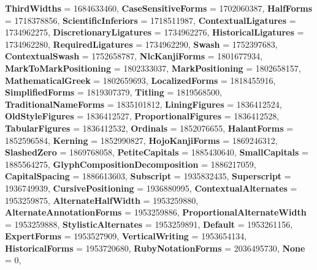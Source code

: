 \begin{DoxyCompactItemize}
\newline
{\bfseries Third\+Widths} = 1684633460, 
{\bfseries Case\+Sensitive\+Forms} = 1702060387, 
{\bfseries Half\+Forms} = 1718378856, 
{\bfseries Scientific\+Inferiors} = 1718511987, 
\newline
{\bfseries Contextual\+Ligatures} = 1734962275, 
{\bfseries Discretionary\+Ligatures} = 1734962276, 
{\bfseries Historical\+Ligatures} = 1734962280, 
{\bfseries Required\+Ligatures} = 1734962290, 
\newline
{\bfseries Swash} = 1752397683, 
{\bfseries Contextual\+Swash} = 1752658787, 
{\bfseries Nlc\+Kanji\+Forms} = 1801677934, 
{\bfseries Mark\+To\+Mark\+Positioning} = 1802333037, 
\newline
{\bfseries Mark\+Positioning} = 1802658157, 
{\bfseries Mathematical\+Greek} = 1802659693, 
{\bfseries Localized\+Forms} = 1818455916, 
{\bfseries Simplified\+Forms} = 1819307379, 
\newline
{\bfseries Titling} = 1819568500, 
{\bfseries Traditional\+Name\+Forms} = 1835101812, 
{\bfseries Lining\+Figures} = 1836412524, 
{\bfseries Old\+Style\+Figures} = 1836412527, 
\newline
{\bfseries Proportional\+Figures} = 1836412528, 
{\bfseries Tabular\+Figures} = 1836412532, 
{\bfseries Ordinals} = 1852076655, 
{\bfseries Halant\+Forms} = 1852596584, 
\newline
{\bfseries Kerning} = 1852990827, 
{\bfseries Hojo\+Kanji\+Forms} = 1869246312, 
{\bfseries Slashed\+Zero} = 1869768058, 
{\bfseries Petite\+Capitals} = 1885430640, 
\newline
{\bfseries Small\+Capitals} = 1885564275, 
{\bfseries Glyph\+Composition\+Decomposition} = 1886217059, 
{\bfseries Capital\+Spacing} = 1886613603, 
{\bfseries Subscript} = 1935832435, 
\newline
{\bfseries Superscript} = 1936749939, 
{\bfseries Cursive\+Positioning} = 1936880995, 
{\bfseries Contextual\+Alternates} = 1953259875, 
{\bfseries Alternate\+Half\+Width} = 1953259880, 
\newline
{\bfseries Alternate\+Annotation\+Forms} = 1953259886, 
{\bfseries Proportional\+Alternate\+Width} = 1953259888, 
{\bfseries Stylistic\+Alternates} = 1953259891, 
{\bfseries Default} = 1953261156, 
\newline
{\bfseries Expert\+Forms} = 1953527909, 
{\bfseries Vertical\+Writing} = 1953654134, 
{\bfseries Historical\+Forms} = 1953720680, 
{\bfseries Ruby\+Notation\+Forms} = 2036495730, 
\newline
{\bfseries None} = 0, 

\end{DoxyCompactItemize}
